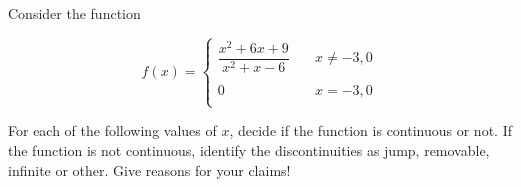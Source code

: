\documentclass[addpoints,12pt]{exam}
\begin{document}
\begin{questions}




\newpage




\question Consider the function


$$ f(x) = \left\{
     \begin{array}{ll}
        \dfrac{x^2+6x+9}{x^2+x-6} & \quad x \neq -3, 0 \\
        \\
         0 & \quad x = -3, 0 \\

      \end{array}
  \right. $$

\bigskip
For each of the following values of $x$, decide if the function is continuous or not. If the function
is not continuous, identify the discontinuities as jump, removable, infinite or other. Give reasons
for your claims!

\end{questions}
\end{document}

